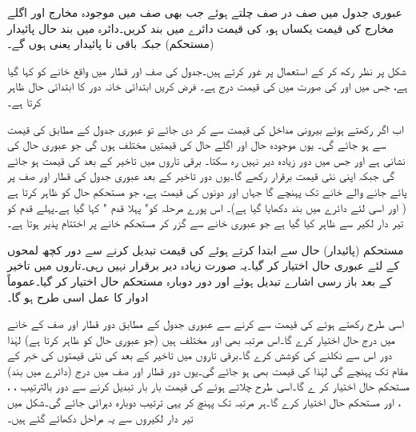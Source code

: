 عبوری جدول میں صف در صف چلتے ہوئے جب بھی صف میں موجودہ مخارج  اور اگلے مخارج  کی قیمت یکساں ہو،  کی قیمت دائرے میں بند کریں۔دائرہ میں بند حال پائیدار (مستحکم) جبکہ باقی نا پائیدار یعنی   ہوں گے۔

شکل پر نظر رکھ کر کے استعمال پر غور کرتے ہیں۔جدول کی  صف اور  قطار میں واقع خانے کو کہا گیا ہے، جس میں  اور  کی صورت میں  کی قیمت درج ہے۔ فرض کریں ابتدائی خانہ دور کا ابتدائی حال ظاہر کرتا ہے۔

اب اگر  رکھتے ہوئے بیرونی مداخل  کی قیمت  سے  کر دی جائے تو عبوری جدول کے مطابق  کی قیمت  سے  ہو جائے گی۔ یوں موجودہ حال  اور اگلے حال  کی قیمتیں مختلف ہوں گی جو عبوری حال کی نشانی ہے اور جس میں دور زیادہ دیر نہیں رہ سکتا۔ برقی تاروں میں تاخیر کے بعد  کی قیمت  ہو جائے گی جبکہ  اپنی نئی قیمت  برقرار رکھے گا۔یوں دور تاخیر کے بعد عبوری جدول کی  قطار اور  صف پر پائے جانے والے خانے تک پہنچے گا جہاں  اور  دونوں کی قیمت  ہے، جو مستحکم حال کو ظاہر کرتا ہے ( اور اسی لئے دائرے میں بند دکھایا گیا ہے)۔ اس پورے مرحلہ کو" پہلا قدم " کہا گیا ہے۔پہلے قدم کو تیر دار لکیر سے ظاہر کیا گیا ہے جو عبوری خانے سے گزر کر مستحکم خانے پر اختتام پذیر ہوتا ہے۔

 مستحکم (پائیدار) حال سے ابتدا کرتے ہوئے  کی قیمت تبدیل کرنے سے دور کچھ لمحوں کے لئے عبوری حال اختیار کر گیا۔یہ صورت زیادہ دیر برقرار نہیں رہی۔تاروں میں تاخیر کے بعد باز رسی اشارے تبدیل ہوئے اور دور دوبارہ مستحکم حال اختیار کر گیا۔عموماً ادوار کا عمل اسی طرح ہو گا۔

اسی طرح  رکھتے ہوئے  کی قیمت  سے  کرنے سے عبوری جدول کے مطابق دور  قطار اور  صف کے خانے میں درج حال  اختیار کرے گا۔اس مرتبہ بھی  اور  مختلف ہیں (جو عبوری حال کو ظاہر کرتا ہے) لہٰذا دور اس سے نکلنے کی کوشش کرے گا۔برقی تاروں میں تاخیر کے بعد  کی نئی قیمتوں کی خبر  کے مقام تک پہنچے گی لہٰذا  کی قیمت بھی  ہو جائے گی۔یوں دور  قطار اور  صف میں درج (دائرے میں بند) مستحکم حال  اختیار کر ے گا۔اسی طرح چلاتے ہوئے  کی قیمت بار بار تبدیل کرنے سے دور بالترتیب  ، ، ، اور  مستحکم حال اختیار کرے گا۔ہر مرتبہ  تک پہنچ کر یہی ترتیب دوبارہ دہرائی جائے گی۔شکل میں تیر دار لکیروں سے یہ مراحل دکھائے گئے ہیں۔

